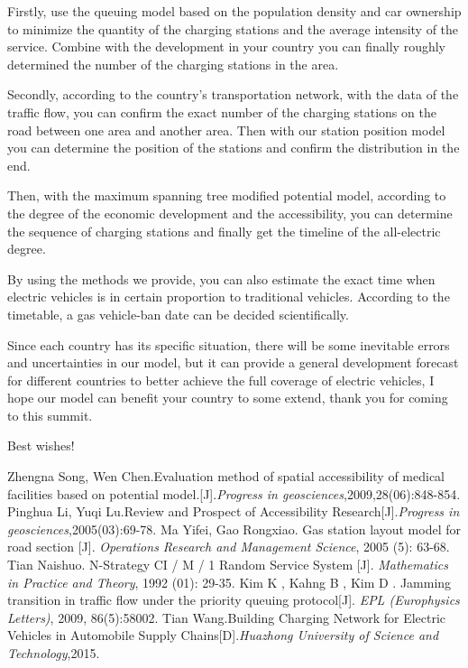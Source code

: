 \documentclass[12pt]{article}  %
\begin{document}
Firstly, use the queuing model based on the population density and car ownership to minimize the quantity of the charging stations and the average intensity of the service. Combine with the development in your country you can finally roughly determined the number of the charging stations in the area.

Secondly, according to the country’s transportation network, with the data of the traffic flow, you can confirm the exact number of the charging stations on the road between one area and another area. Then with our station position model you can determine the position of the stations and confirm the distribution in the end.

Then, with the maximum spanning tree modified potential model, according to the degree of the economic development and the accessibility, you can determine the sequence of charging stations and finally get the timeline of the all-electric degree.

By using the methods we provide, you can also estimate the exact time when electric vehicles is in certain proportion to traditional vehicles. According to the timetable, a gas vehicle-ban date can be decided scientifically.

Since each country has its specific situation, there will be some inevitable errors and uncertainties in our model, but it can provide a general development forecast for different countries to better achieve the full coverage of electric vehicles, I hope our model can benefit your country to some extend, thank you for coming to this summit.

Best wishes!
\clearpage
\begin{thebibliography}{99}
Zhengna Song, Wen Chen.Evaluation method of spatial accessibility of medical facilities based on potential model.[J].\emph{Progress in geosciences},2009,28(06):848-854.
Pinghua Li, Yuqi Lu.Review and Prospect of Accessibility Research[J].\emph{Progress in geosciences},2005(03):69-78.
Ma Yifei, Gao Rongxiao. Gas station layout model for road section [J]. \emph{Operations Research and Management Science}, 2005 (5): 63-68.
Tian Naishuo. N-Strategy CI / M / 1 Random Service System [J]. \emph{Mathematics in Practice and Theory}, 1992 (01): 29-35.
Kim K , Kahng B , Kim D . Jamming transition in traffic flow under the priority queuing protocol[J]. \emph{EPL (Europhysics Letters)}, 2009, 86(5):58002.
Tian Wang.Building Charging Network for Electric Vehicles in Automobile Supply Chains[D].\emph{Huazhong University of Science and Technology},2015.
\end{thebibliography}
\end{document}

